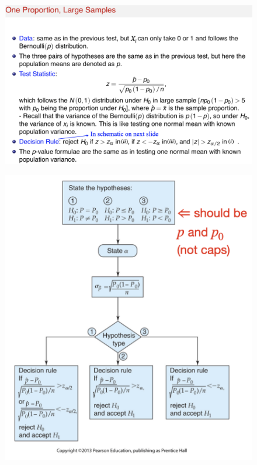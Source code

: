 \documentclass[14pt]{extarticle}
\begin{document}
\begin{figure}[H]
    \centering
    \includegraphics[width=1\textwidth]{fig23.png}
\end{figure}

\begin{figure}[H]
    \centering
    \includegraphics[width=1\textwidth]{fig24.png}
\end{figure}
\end{document}
